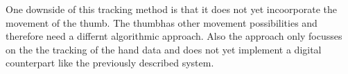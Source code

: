 One downside of this tracking method is that it does not yet incoorporate the movement of the thumb. The thumbhas other movement possibilities and therefore need a differnt algorithmic approach. Also the approach only focusses on the the tracking of the hand data and does not yet implement a digital counterpart like the previously described system.



























